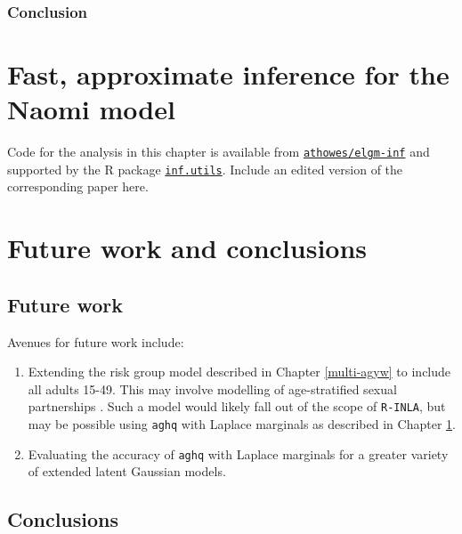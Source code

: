 \documentclass[a4paper, nobind]{templates/ociamthesis}
\providecommand{\tightlist}{%
  \setlength{\itemsep}{0pt}\setlength{\parskip}{0pt}}
\begin{document}
\hypertarget{conclusion-1}{%
\subsection{Conclusion}\label{conclusion-1}}

\hypertarget{elgm-inf}{%
\chapter{Fast, approximate inference for the Naomi model}\label{elgm-inf}}

\adjustmtc
{}

Code for the analysis in this chapter is available from \href{https://github.com/athowes/elgm-inf}{\texttt{athowes/elgm-inf}} and supported by the R package \href{https://athowes.github.io/inf.utils}{\texttt{inf.utils}}.
Include an edited version of the corresponding paper here.

\hypertarget{future-work-and-conclusions}{%
\chapter{Future work and conclusions}\label{future-work-and-conclusions}}

\adjustmtc
{}

\hypertarget{future-work}{%
\section{Future work}\label{future-work}}

Avenues for future work include:

\begin{enumerate}
\def\labelenumi{\arabic{enumi}.}
\tightlist
\item
  Extending the risk group model described in Chapter \ref{multi-agyw} to include all adults 15-49. This may involve modelling of age-stratified sexual partnerships \autocite{wolock2021evaluating}. Such a model would likely fall out of the scope of \texttt{R-INLA}, but may be possible using \texttt{aghq} with Laplace marginals as described in Chapter \ref{elgm-inf}.
\item
  Evaluating the accuracy of \texttt{aghq} with Laplace marginals for a greater variety of extended latent Gaussian models.
\end{enumerate}

\hypertarget{conclusions}{%
\section{Conclusions}\label{conclusions}}
\end{document}
